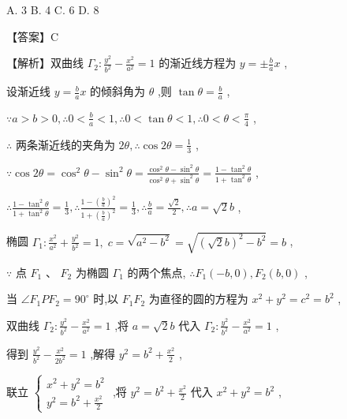 \documentclass[10pt]{article}
\begin{document}
A. 3 B. 4 C. 6 D. 8

【答案】C

【解析】双曲线 \({\Gamma }_{2} : \frac{{y}^{2}}{{b}^{2}} - \frac{{x}^{2}}{{a}^{2}} = 1\) 的渐近线方程为 \(y =  \pm  \frac{b}{a}x\) ,

设渐近线 \(y = \frac{b}{a}x\) 的倾斜角为 \(\theta\) ,则 \(\tan \theta  = \frac{b}{a}\) ,

\(\because a > b > 0,\therefore 0 < \frac{b}{a} < 1,\therefore 0 < \tan \theta  < 1,\therefore 0 < \theta  < \frac{\pi }{4}\) ,

\(\therefore\) 两条渐近线的夹角为 \({2\theta },\therefore \cos {2\theta } = \frac{1}{3}\) ,

\(\because \cos {2\theta } = {\cos }^{2}\theta  - {\sin }^{2}\theta  = \frac{{\cos }^{2}\theta  - {\sin }^{2}\theta }{{\cos }^{2}\theta  + {\sin }^{2}\theta } = \frac{1 - {\tan }^{2}\theta }{1 + {\tan }^{2}\theta }\) ,

\(\therefore \frac{1 - {\tan }^{2}\theta }{1 + {\tan }^{2}\theta } = \frac{1}{3},\therefore \frac{1 - {\left( \frac{b}{a}\right) }^{2}}{1 + {\left( \frac{b}{a}\right) }^{2}} = \frac{1}{3},\therefore \frac{b}{a} = \frac{\sqrt{2}}{2},\therefore a = \sqrt{2}b\) ,

椭圆 \({\Gamma }_{1} : \frac{{x}^{2}}{{a}^{2}} + \frac{{y}^{2}}{{b}^{2}} = 1,\;c = \sqrt{{a}^{2} - {b}^{2}} = \sqrt{{\left( \sqrt{2}b\right) }^{2} - {b}^{2}} = b\) ,

\(\because\) 点 \({F}_{1}\text{ 、 }{F}_{2}\) 为椭圆 \({\Gamma }_{1}\) 的两个焦点, \(\therefore {F}_{1}\left( {-b,0}\right) ,{F}_{2}\left( {b,0}\right)\) ,

当 \(\angle {F}_{1}P{F}_{2} = {90}^{ \circ  }\) 时,以 \({F}_{1}{F}_{2}\) 为直径的圆的方程为 \({x}^{2} + {y}^{2} = {c}^{2} = {b}^{2}\) ,

双曲线 \({\Gamma }_{2} : \frac{{y}^{2}}{{b}^{2}} - \frac{{x}^{2}}{{a}^{2}} = 1\) ,将 \(a = \sqrt{2}b\) 代入 \({\Gamma }_{2} : \frac{{y}^{2}}{{b}^{2}} - \frac{{x}^{2}}{{a}^{2}} = 1\) ,

得到 \(\frac{{y}^{2}}{{b}^{2}} - \frac{{x}^{2}}{2{b}^{2}} = 1\) ,解得 \({y}^{2} = {b}^{2} + \frac{{x}^{2}}{2}\) ,

联立 \(\left\{  \begin{array}{l} {x}^{2} + {y}^{2} = {b}^{2} \\  {y}^{2} = {b}^{2} + \frac{{x}^{2}}{2} \end{array}\right.\) ,将 \({y}^{2} = {b}^{2} + \frac{{x}^{2}}{2}\) 代入 \({x}^{2} + {y}^{2} = {b}^{2}\) ,
\end{document}
